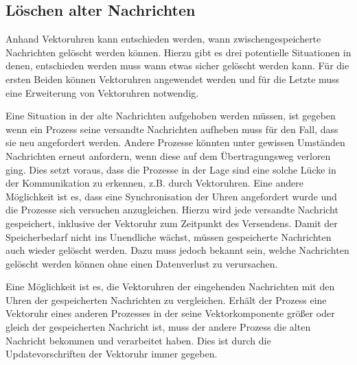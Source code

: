 \subsection{Löschen alter Nachrichten}
Anhand Vektoruhren kann entschieden werden, wann zwischengespeicherte Nachrichten gelöscht werden können.
Hierzu gibt es drei potentielle Situationen in denen, entschieden werden muss wann etwas sicher gelöscht werden kann.
Für die ersten Beiden können Vektoruhren angewendet werden und für die Letzte muss eine Erweiterung von Vektoruhren notwendig.

Eine Situation in der alte Nachrichten aufgehoben werden müssen, ist gegeben wenn ein Prozess seine versandte Nachrichten aufheben muss für den Fall, dass sie neu angefordert werden.
Andere Prozesse könnten unter gewissen Umständen Nachrichten erneut anfordern, wenn diese auf dem Übertragungsweg verloren ging.
Dies setzt voraus, dass die Prozesse in der Lage sind eine solche Lücke in der Kommunikation zu erkennen, z.B. durch Vektoruhren.
Eine andere Möglichkeit ist es, dass eine Synchronisation der Uhren angefordert wurde und die Prozesse sich versuchen anzugleichen.
Hierzu wird jede versandte Nachricht gespeichert, inklusive der Vektoruhr zum Zeitpunkt des Versendens.
Damit der Speicherbedarf nicht ins Unendliche wächst, müssen gespeicherte Nachrichten auch wieder gelöscht werden.
Dazu muss jedoch bekannt sein, welche Nachrichten gelöscht werden können ohne einen Datenverlust zu verursachen.

Eine Möglichkeit ist es, die Vektoruhren der eingehenden Nachrichten mit den Uhren der gespeicherten Nachrichten zu vergleichen.
Erhält der Prozess eine Vektoruhr eines anderen Prozesses in der seine Vektorkomponente größer oder gleich der gespeicherten Nachricht ist, muss der andere Prozess die alten Nachricht bekommen und verarbeitet haben.
Dies ist durch die Updatevorschriften der Vektoruhr immer gegeben.

